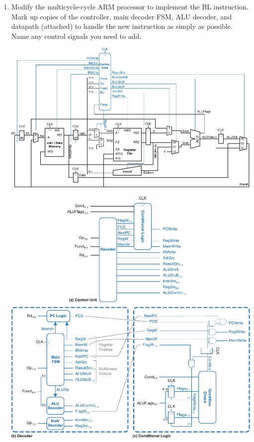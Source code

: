 \documentclass{e85}
\date{2019 April 24 (Wednesday)}
\author{Kye W. Shi}
\begin{document}
\begin{enumerate}
\item Modify the multicycle-cycle ARM processor to implement the BL
  instruction.  Mark up copies of the controller, main decoder FSM,
  ALU decoder, and datapath (attached) to handle the new instruction
  as simply as possible.  Name any control signals you need to add.

  \begin{solution}
    \begin{center}
      \includegraphics[width=\linewidth]
      {figures/1-bl/ddca-multicycle-datapath.pdf}

      \includegraphics[width=\linewidth]
      {figures/1-bl/ddca-multicycle-control-unit.pdf}


\end{center}
\end{solution}
\end{enumerate}
\end{document}
